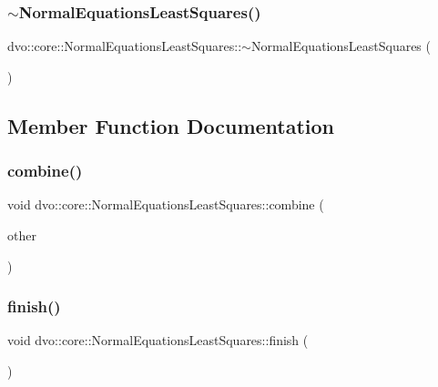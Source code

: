 \subsubsection{\texorpdfstring{$\sim$\+Normal\+Equations\+Least\+Squares()}{~NormalEquationsLeastSquares()}}
{\footnotesize\ttfamily dvo\+::core\+::\+Normal\+Equations\+Least\+Squares\+::$\sim$\+Normal\+Equations\+Least\+Squares (\begin{DoxyParamCaption}{ }\end{DoxyParamCaption})\hspace{0.3cm}{\ttfamily [virtual]}}



\subsection{Member Function Documentation}
\mbox{\label{classdvo_1_1core_1_1_normal_equations_least_squares_a9665b0bf93aac4348dc9ad18c39cf886}} 
\subsubsection{\texorpdfstring{combine()}{combine()}}
{\footnotesize\ttfamily void dvo\+::core\+::\+Normal\+Equations\+Least\+Squares\+::combine (\begin{DoxyParamCaption}\item[{const \mbox{\hyperlink{classdvo_1_1core_1_1_normal_equations_least_squares}{Normal\+Equations\+Least\+Squares}} \&}]{other }\end{DoxyParamCaption})}

\mbox{\label{classdvo_1_1core_1_1_normal_equations_least_squares_a0da5301414f684b8e3ebfa9c4794af31}} 
\subsubsection{\texorpdfstring{finish()}{finish()}}
{\footnotesize\ttfamily void dvo\+::core\+::\+Normal\+Equations\+Least\+Squares\+::finish (\begin{DoxyParamCaption}{ }\end{DoxyParamCaption})\hspace{0.3cm}{\ttfamily [virtual]}}



